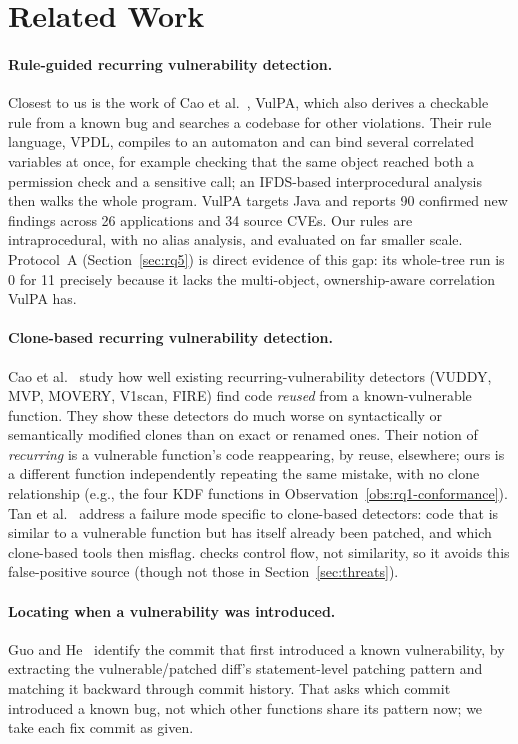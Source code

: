 \section{Related Work}
\label{sec:related}

\paragraph{Rule-guided recurring vulnerability detection.} Closest to us
is the work of Cao et al.~\cite{cao2025vulpa}, VulPA, which also derives
a checkable rule from a known bug and searches a codebase for other
violations. Their rule language, VPDL, compiles to an automaton and
can bind several correlated variables at once, for example checking that
the same object reached both a permission check and a sensitive call; an
IFDS-based interprocedural analysis then walks the whole program. VulPA
targets Java and reports 90 confirmed new findings across 26 applications
and 34 source CVEs. Our rules are intraprocedural, with no alias analysis,
and evaluated on far smaller scale. Protocol~A (Section~\ref{sec:rq5}) is
direct evidence of this gap: its whole-tree run is 0 for 11 precisely
because it lacks the multi-object, ownership-aware correlation VulPA has.

\paragraph{Clone-based recurring vulnerability detection.} Cao et
al.~\cite{cao2025issta} study how well existing recurring-vulnerability
detectors (VUDDY, MVP, MOVERY, V1scan, FIRE) find code \emph{reused} from
a known-vulnerable function. They show these detectors do much worse on
syntactically or semantically modified clones than on exact or renamed
ones. Their notion of \emph{recurring} is a vulnerable function's code
reappearing, by reuse, elsewhere; ours is a different function
independently repeating the same mistake, with no clone relationship (e.g.,
the four KDF functions in Observation~\ref{obs:rq1-conformance}). Tan et al.~\cite{tan2025icse}
address a failure mode specific to clone-based detectors: code that is
similar to a vulnerable function but has itself already been patched, and
which clone-based tools then misflag. \tool checks control flow, not similarity, so it avoids this false-positive
source (though not those in Section~\ref{sec:threats}).

\paragraph{Locating when a vulnerability was introduced.} Guo and
He~\cite{guo2026ndssvic} identify the commit that first introduced a
known vulnerability, by extracting the vulnerable/patched diff's
statement-level patching pattern and matching it backward through commit
history. That asks which commit introduced a known bug, not which other functions
share its pattern now; we take each fix commit as given.

